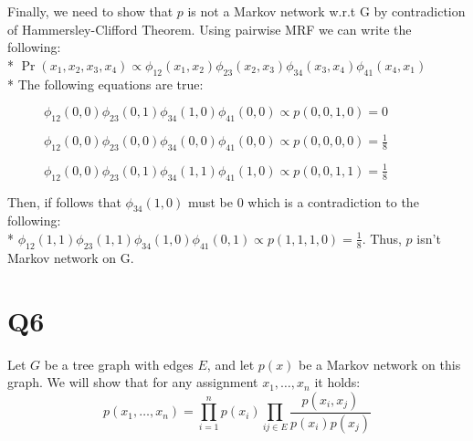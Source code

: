 \documentclass[11pt]{article}
\begin{document}
Finally, we need to show that $p$ is not a Markov network w.r.t G by contradiction of Hammersley-Clifford Theorem. Using pairwise MRF we can write the following: \\*
$\Pr(x_1,x_2,x_3,x_4) \propto \phi_{12}(x_1,x_2)\phi_{23}(x_2,x_3)\phi_{34}(x_3,x_4)\phi_{41}(x_4,x_1)$ \\*
The following equations are true:
\begin{description}
	\item[] $\phi_{12}(0,0)\phi_{23}(0,1)\phi_{34}(1,0)\phi_{41}(0,0) \propto p(0,0,1,0) = 0$
	\item[] $\phi_{12}(0,0)\phi_{23}(0,0)\phi_{34}(0,0)\phi_{41}(0,0) \propto p(0,0,0,0) = \frac{1}{8}$
	\item[] $\phi_{12}(0,0)\phi_{23}(0,1)\phi_{34}(1,1)\phi_{41}(1,0) \propto p(0,0,1,1) = \frac{1}{8}$
\end{description}
Then, if follows that $\phi_{34}(1,0)$ must be 0 which is a contradiction to the following: \\*
$\phi_{12}(1,1)\phi_{23}(1,1)\phi_{34}(1,0)\phi_{41}(0,1) \propto p(1,1,1,0) = \frac{1}{8}$. Thus, $p$ isn't Markov network on G.

\part*{Q6}
Let $G$ be a tree graph with edges $E$, and let $p(x)$ be a Markov network on this graph.
We will show that for any assignment $x_1,\ldots,x_n$ it holds:
\begin{equation}
p(x_1,\ldots,x_n) = \prod_{i=1}^{n}p(x_i) \prod_{ij\in E}\frac{p(x_i,x_j)}{p(x_i)p(x_j)}
\end{equation}
\end{document}
